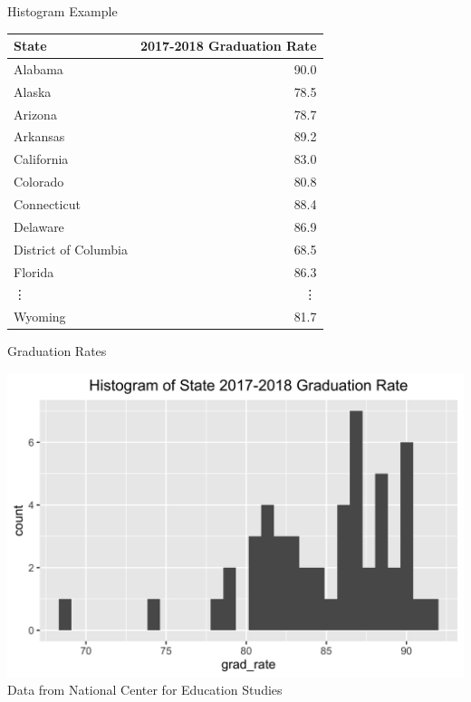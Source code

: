 \documentclass{beamer}
\begin{document}
\begin{frame}{Histogram Example}
    \begin{tabular}{l|r}
        \hline
        \textbf{State} & \textbf{2017-2018 Graduation Rate}\\
        \hline
        Alabama & 90.0\\
        \hline
        Alaska & 78.5\\
        \hline
        Arizona & 78.7\\
        \hline
        Arkansas & 89.2\\
        \hline
        California & 83.0\\
        \hline
        Colorado & 80.8\\
        \hline
        Connecticut & 88.4\\
        \hline
        Delaware & 86.9\\
        \hline
        District of Columbia & 68.5\\
        \hline
        Florida & 86.3\\
        \hline 
        \vdots & \vdots \\
        \hline
        Wyoming & 81.7\\
        \hline
    \end{tabular}
    
\end{frame}


\begin{frame}{Graduation Rates}
    \begin{center}
    \includegraphics[width= \linewidth]{hist.png}
    {\footnotesize Data from National Center for Education Studies}
    \end{center}
\end{frame}
\end{document}
